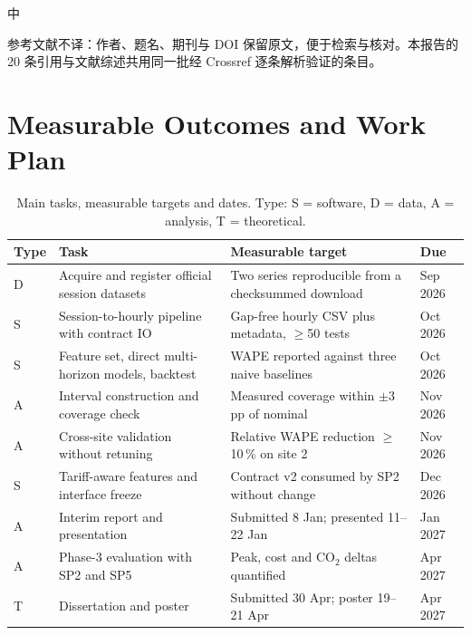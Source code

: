 \documentclass[10pt,a4paper]{article}
\newenvironment{zh}{%
  \par\vspace{1pt}%
  \begingroup
  \color{black!72}\small
  \setlength{\parskip}{0pt}%
  \noindent\textsf{\footnotesize 中}\hspace{3pt}\ignorespaces
}{%
  \par\endgroup\vspace{4pt}%
}
\begin{document}
\begin{zh}
参考文献不译：作者、题名、期刊与 DOI 保留原文，便于检索与核对。本报告的 20 条引用与文献综述共用同一批经 Crossref 逐条解析验证的条目。
\end{zh}




\clearpage
\section{Measurable Outcomes and Work Plan}\label{sec:plan}

\begin{table}[H]
\centering
\caption{Main tasks, measurable targets and dates. Type: S = software, D = data, A = analysis,
T = theoretical.}
\label{tab:plan}
\small
\renewcommand{\arraystretch}{1.12}
\begin{tabular}{@{}p{0.6cm}p{6.6cm}p{6.0cm}p{2.1cm}@{}}
\toprule
Type & Task & Measurable target & Due \\
\midrule
D & Acquire and register official session datasets & Two series reproducible from a checksummed download & Sep 2026 \\
S & Session-to-hourly pipeline with contract IO & Gap-free hourly CSV plus metadata, $\geq$50 tests & Oct 2026 \\
S & Feature set, direct multi-horizon models, backtest & WAPE reported against three naive baselines & Oct 2026 \\
A & Interval construction and coverage check & Measured coverage within $\pm$3\,pp of nominal & Nov 2026 \\
A & Cross-site validation without retuning & Relative WAPE reduction $\geq$10\,\% on site 2 & Nov 2026 \\
S & Tariff-aware features and interface freeze & Contract v2 consumed by SP2 without change & Dec 2026 \\
A & Interim report and presentation & Submitted 8 Jan; presented 11--22 Jan & Jan 2027 \\
A & Phase-3 evaluation with SP2 and SP5 & Peak, cost and CO$_2$ deltas quantified & Apr 2027 \\
T & Dissertation and poster & Submitted 30 Apr; poster 19--21 Apr & Apr 2027 \\
\bottomrule
\end{tabular}
\end{table}
\end{document}
